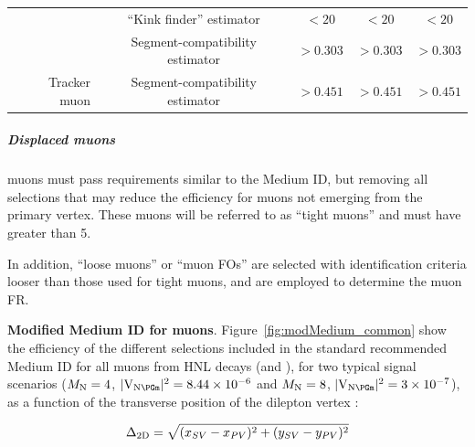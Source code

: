 \begin{table}[h!]
{\begin{tabular}{r|c|c|c|c}
      & ``Kink finder'' estimator & $<20$ & $<20$ & $<20$ \\
      & Segment-compatibility estimator & $>0.303$ & $>0.303$ & $>0.303$ \\
      \hline
      Tracker muon & Segment-compatibility estimator & $>0.451$ & $>0.451$ & $>0.451$ \\
      \hline
    \end{tabular}
    }
\end{table}

\subparagraph {Displaced muons}\label{sec:c6muons}
\Displ muons must pass requirements similar to the Medium ID, but
removing all selections that may reduce the efficiency for muons not
emerging from the primary vertex.
These \displ muons will be referred to as ``tight \displ muons''
and must have \pt greater than 5\GeV.

In addition, ``loose \displ muons'' or ``muon FOs'' are selected
with identification criteria looser than those used for tight
\displ muons, and are employed to determine the muon FR.

\textbf{Modified Medium ID for \displ muons}.
Figure~\ref{fig:modMedium_common}
show the efficiency of the different selections included in the
standard recommended Medium ID for all \displ muons from HNL
decays (\ltwo and \lthree), for two typical signal scenarios
($M_{\mathrm{N}}=4$\GeV, $\mixparm=8.44\times10^{-6}$ and
$M_{\mathrm{N}}=8$\GeV, $\mixparm=3\times10^{-7}$),
as a function of the transverse position of the dilepton vertex
\Deltwod:

$$\Delta_{\mathrm{2D}} = \sqrt{(x_{SV}-x_{PV})^{2} + (y_{SV}-y_{PV})^{2}}$$

